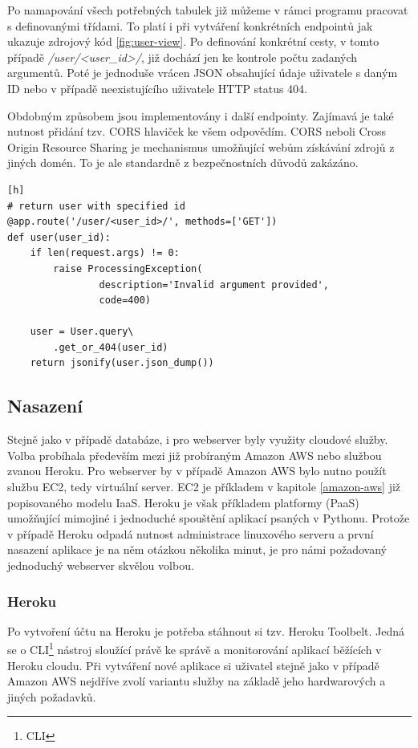\documentclass[thesis=B,czech]{FITthesis}[2012/06/26]
\begin{document}
Po namapování všech potřebných tabulek již můžeme v rámci programu pracovat s definovanými třídami. To platí i při vytváření konkrétních endpointů jak ukazuje zdrojový kód \ref{fig:user-view}. Po definování konkrétní cesty, v tomto případě \textit{/user/<user\_id>/}, již dochází jen ke kontrole počtu zadaných argumentů. Poté je jednoduše vrácen JSON obsahující údaje uživatele s daným ID nebo v případě neexistujícího uživatele HTTP status 404. 

Obdobným způsobem jsou implementovány i další endpointy. Zajímavá je také nutnost přidání tzv. CORS hlaviček ke všem odpovědím. CORS neboli Cross Origin Resource Sharing je mechanismus umožňující webům získávání zdrojů z jiných domén. To je ale standardně z bezpečnostních důvodů zakázáno. 

\begin{lstlisting}[caption={Ukázka implementace konkrétního API endpointu},label=fig:user-view][h]
# return user with specified id
@app.route('/user/<user_id>/', methods=['GET'])
def user(user_id):
	if len(request.args) != 0:
		raise ProcessingException(
				description='Invalid argument provided',
				code=400)

	user = User.query\
		.get_or_404(user_id)
	return jsonify(user.json_dump())
\end{lstlisting} 

\subsection{Nasazení}
Stejně jako v případě databáze, i pro webserver byly využity cloudové služby. Volba probíhala především mezi již probíraným Amazon AWS nebo službou zvanou Heroku. Pro webserver by v případě Amazon AWS bylo nutno použít službu EC2, tedy virtuální server. EC2 je příkladem v kapitole \ref{amazon-aws} již popisovaného modelu IaaS. Heroku je však příkladem platformy (PaaS) umožňující mimojiné i jednoduché spouštění aplikací psaných v Pythonu. Protože v případě Heroku odpadá nutnost administrace linuxového serveru a první nasazení aplikace je na něm otázkou několika minut, je pro námi požadovaný jednoduchý webserver skvělou volbou. 

\subsubsection{Heroku}
Po vytvoření účtu na Heroku je potřeba stáhnout si tzv. Heroku Toolbelt. Jedná se o CLI\footnote{CLI} nástroj sloužící právě ke správě a monitorování aplikací běžících v Heroku cloudu. Při vytváření nové aplikace si uživatel stejně jako v případě Amazon AWS nejdříve zvolí variantu služby na základě jeho hardwarových a jiných požadavků. 
\end{document}
